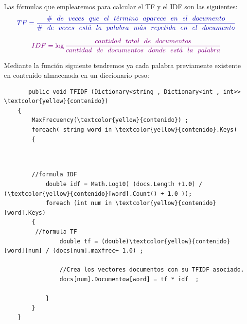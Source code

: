 \documentclass{beamer}
\begin{document}
\begin{frame}

  Las fórmulas que emplearemos para calcular el TF y el IDF son las siguientes:    
\begin{equation} \label{eq:TF}
\textcolor{blue!70!black}{TF  =  \tiny\frac{{\#\quad de\quad veces\quad que\quad el\quad t\acute{e}rmino\quad aparece\quad en\quad el\quad documento}}{{\#\quad de\quad veces\quad est\acute{a}\quad la\quad palabra\quad m\acute{a}s\quad repetida\quad en\quad el\quad documento}}}
\end{equation}    


 \begin{equation}
               \textcolor{violet!100!black} {IDF = \tiny \log \frac{cantidad\quad total\quad de\quad documentos}{cantidad\quad de\quad documentos\quad donde\quad est\acute{a}\quad la\quad palabra} }
            \end{equation}


\end{frame}


\begin{frame}[fragile]
    Mediante la función siguiente tendremos ya cada palabra previamente existente en \textcolor{yellow!80!black}{contenido} almacenada en un diccionario peso:

\begin{lstlisting}
       public void TFIDF (Dictionary<string , Dictionary<int , int>> \textcolor{yellow}{contenido})
    {   
        MaxFrecuency(\textcolor{yellow}{contenido}) ; 
        foreach( string word in \textcolor{yellow}{contenido}.Keys)
        {
            
               
\end{lstlisting}


\end{frame}

\begin{frame}[fragile]
    \begin{lstlisting}
        //formula IDF
            double idf = Math.Log10( (docs.Length +1.0) / (\textcolor{yellow}{contenido}[word].Count() + 1.0 ));
            foreach (int num in \textcolor{yellow}{contenido}[word].Keys)
        {
         //formula TF
                double tf = (double)\textcolor{yellow}{contenido}[word][num] / (docs[num].maxfrec+ 1.0) ;
                
                //Crea los vectores documentos con su TFIDF asociado.
                docs[num].Documentow[word] = tf * idf  ;
                
            }
        }    
    }   




    \end{lstlisting}
    
\end{frame}
\end{document}
